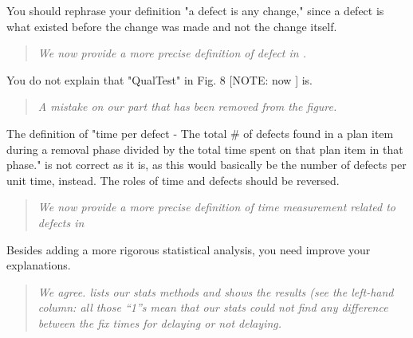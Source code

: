 You should rephrase your definition "a defect is any change," since a defect is what existed before the change was made and not the change itself.
\begin{quote}
{\em We now provide a more precise definition of defect in .
}
\end{quote} 
You do not explain that "QualTest" in Fig. 8 [NOTE: now ] is.
\begin{quote}
{\em A mistake on our part that has been removed from the figure.}
\end{quote}
The definition of "time per defect - The total \# of defects found in a plan item during a removal phase divided by the total time spent on that plan item in that phase." is not correct as it is, as this would basically be the number of defects per unit time, instead. The roles of time and
defects should be reversed.
\begin{quote}{\em We now provide a more precise definition of time measurement related to defects in }\end{quote}

  

Besides adding a more rigorous statistical analysis, you
need improve your explanations.
\begin{quote}{\em We agree.  lists our stats methods and 
shows the results (see the left-hand column: all those ``1''s mean
that our stats could not find any difference between the fix times for
delaying or not delaying.}\end{quote}


